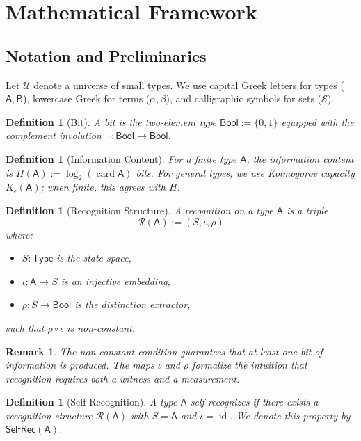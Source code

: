 \documentclass[12pt,a4paper]{article}
\newtheorem{definition}[theorem]{Definition}
\newtheorem{remark}[theorem]{Remark}
\DeclareMathOperator{\card}{card}
\DeclareMathOperator{\id}{id}
\newcommand{\Bool}{\mathsf{Bool}}
\begin{document}
\section{Mathematical Framework}

\subsection{Notation and Preliminaries}

Let $\mathcal{U}$ denote a universe of small types. We use capital Greek letters for types ($\mathsf{A}, \mathsf{B}$), lowercase Greek for terms ($\alpha, \beta$), and calligraphic symbols for sets ($\mathcal{S}$).

\begin{definition}[Bit]
A \emph{bit} is the two-element type $\Bool := \{0,1\}$ equipped with the complement involution $\neg : \Bool \to \Bool$.
\end{definition}

\begin{definition}[Information Content]
For a finite type $\mathsf{A}$, the information content is $H(\mathsf{A}) := \log_2(\card \mathsf{A})$ bits. For general types, we use Kolmogorov capacity $K_\epsilon(\mathsf{A})$; when finite, this agrees with $H$.
\end{definition}

\begin{definition}[Recognition Structure]
A recognition on a type $\mathsf{A}$ is a triple
\[
\mathcal{R}(\mathsf{A}) := (S, \iota, \rho)
\]
where:
\begin{itemize}
\item $S : \mathsf{Type}$ is the state space,
\item $\iota : \mathsf{A} \to S$ is an injective embedding,
\item $\rho : S \to \Bool$ is the distinction extractor,
\end{itemize}
such that $\rho \circ \iota$ is non-constant.
\end{definition}

\begin{remark}
The non-constant condition guarantees that at least one bit of information is produced. The maps $\iota$ and $\rho$ formalize the intuition that recognition requires both a witness and a measurement.
\end{remark}

\begin{definition}[Self-Recognition]
A type $\mathsf{A}$ \emph{self-recognizes} if there exists a recognition structure $\mathcal{R}(\mathsf{A})$ with $S = \mathsf{A}$ and $\iota = \id$. We denote this property by $\mathsf{SelfRec}(\mathsf{A})$.
\end{definition}
\end{document}
